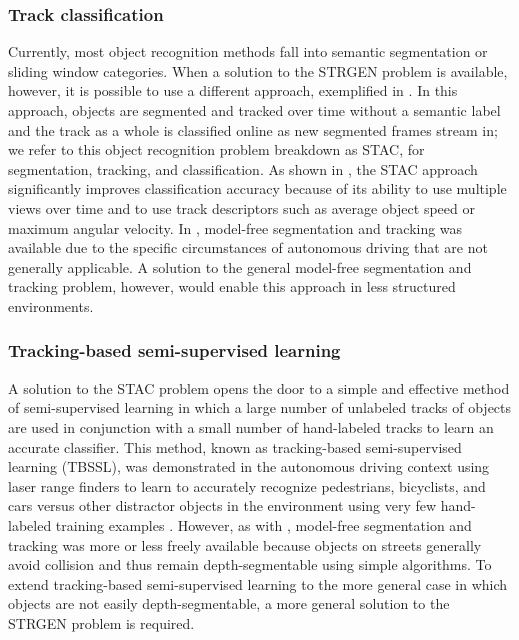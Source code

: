 \documentclass[graybox]{svmult}
\begin{document}
\subsubsection{Track classification}

Currently, most object recognition methods fall into semantic segmentation or sliding window categories.  When a solution to the STRGEN problem is available, however, it is possible to use a different approach, exemplified in \cite{teichman2011a}.  In this approach, objects are segmented and tracked over time without a semantic label and the track as a whole is classified online as new segmented frames stream in; we refer to this object recognition problem breakdown as STAC, for segmentation, tracking, and classification.  As shown in \cite{teichman2011a}, the STAC approach significantly improves classification accuracy because of its ability to use multiple views over time and to use track descriptors such as average object speed or maximum angular velocity.  In \cite{teichman2011a}, model-free segmentation and tracking was available due to the specific circumstances of autonomous driving that are not generally applicable.  A solution to the general model-free segmentation and tracking problem, however, would enable this approach in less structured environments.

\subsubsection{Tracking-based semi-supervised learning}

A solution to the STAC problem opens the door to a simple and effective method of semi-supervised learning in which a large number of unlabeled tracks of objects are used in conjunction with a small number of hand-labeled tracks to learn an accurate classifier.  This method, known as tracking-based semi-supervised learning (TBSSL), was demonstrated in the autonomous driving context using laser range finders to learn to accurately recognize pedestrians, bicyclists, and cars versus other distractor objects in the environment using very few hand-labeled training examples \cite{teichman2011b}. However, as with \cite{teichman2011a}, model-free segmentation and tracking was more or less freely available because objects on streets generally avoid collision and thus remain depth-segmentable using simple algorithms.  To extend tracking-based semi-supervised learning to the more general case in which objects are not easily depth-segmentable, a more general solution to the STRGEN problem is required.
\end{document}
